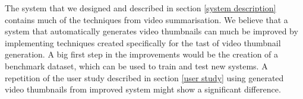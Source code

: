 \documentclass{../resources/sig-alternate-05-2015}
\begin{document}
The system that we designed and described in section \ref{system description} contains much of the techniques from video summarisation. We believe that a system that automatically generates video thumbnails can much be improved by implementing techniques created specifically for the tast of video thumbnail generation. A big first step in the improvements would be the creation of a benchmark dataset, which can be used to train and test new systems. A repetition of the user study described in section \ref{user study} using generated video thumbnails from improved system might show a significant difference.



\printbibliography
\end{document}
